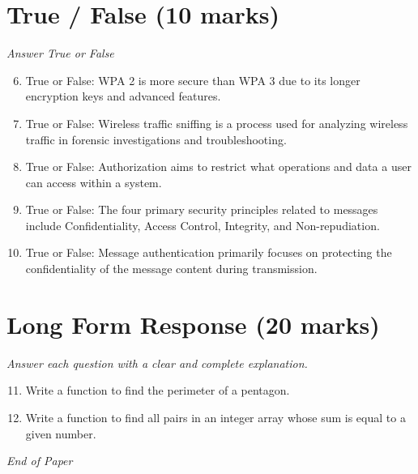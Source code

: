 \documentclass[12pt]{article}
\begin{document}
\section*{True / False (10 marks)}
\textit{Answer True or False}
\begin{enumerate}[label=\arabic*.]
\setcounter{enumi}{5}
\item True or False: WPA 2 is more secure than WPA 3 due to its longer encryption keys and advanced features.
\item True or False: Wireless traffic sniffing is a process used for analyzing wireless traffic in forensic investigations and troubleshooting.
\item True or False: Authorization aims to restrict what operations and data a user can access within a system.
\item True or False: The four primary security principles related to messages include Confidentiality, Access Control, Integrity, and Non-repudiation.
\item True or False: Message authentication primarily focuses on protecting the confidentiality of the message content during transmission.
\end{enumerate}

\section*{Long Form Response (20 marks)}
\textit{Answer each question with a clear and complete explanation.}
\begin{enumerate}[label=\arabic*.]
\setcounter{enumi}{10}
\item Write a function to find the perimeter of a pentagon.
\item Write a function to find all pairs in an integer array whose sum is equal to a given number.
\end{enumerate}

\vfill
\noindent\textit{End of Paper}
\end{document}
